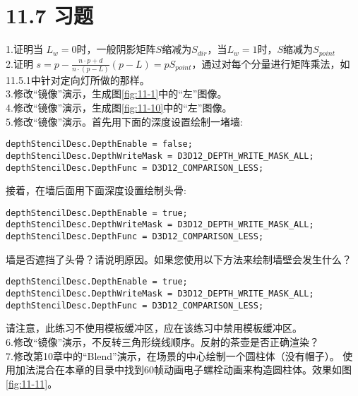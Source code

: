 \chapter{11.7 习题}
\begin{flushleft}
1.证明当 $L_{w}=0$时，一般阴影矩阵$S$缩减为$S_{dir}$，当$L_{w}=1$时，$S$缩减为$S_{point}$\\
2.证明 $s=p-\frac{n\cdot p+d}{n\cdot (p-L)}(p-L)=pS_{point}$，通过对每个分量进行矩阵乘法，如11.5.1中针对定向灯所做的那样。\\
3.修改“镜像”演示，生成图\ref{fig:11-1}中的“左”图像。\\
4.修改“镜像”演示，生成图\ref{fig:11-10}中的“左”图像。\\
5.修改“镜像”演示。首先用下面的深度设置绘制一堵墙:\\
\end{flushleft}

\begin{lstlisting}
depthStencilDesc.DepthEnable = false;
depthStencilDesc.DepthWriteMask = D3D12_DEPTH_WRITE_MASK_ALL;
depthStencilDesc.DepthFunc = D3D12_COMPARISON_LESS;
\end{lstlisting}

\begin{flushleft}
接着，在墙后面用下面深度设置绘制头骨:\\
\end{flushleft}

\begin{lstlisting}
depthStencilDesc.DepthEnable = true;
depthStencilDesc.DepthWriteMask = D3D12_DEPTH_WRITE_MASK_ALL;
depthStencilDesc.DepthFunc = D3D12_COMPARISON_LESS;
\end{lstlisting}

\begin{flushleft}
墙是否遮挡了头骨？请说明原因。如果您使用以下方法来绘制墙壁会发生什么？\\
\end{flushleft}

\begin{lstlisting}
depthStencilDesc.DepthEnable = true;
depthStencilDesc.DepthWriteMask = D3D12_DEPTH_WRITE_MASK_ALL;
depthStencilDesc.DepthFunc = D3D12_COMPARISON_LESS;
\end{lstlisting}

\begin{flushleft}
请注意，此练习不使用模板缓冲区，应在该练习中禁用模板缓冲区。\\

6.修改“镜像”演示，不反转三角形绕线顺序。反射的茶壶是否正确渲染？\\
7.修改第10章中的“Blend”演示，在场景的中心绘制一个圆柱体（没有帽子）。 使用加法混合在本章的目录中找到60帧动画电子螺栓动画来构造圆柱体。效果如图\ref{fig:11-11}。\\
\end{flushleft}

